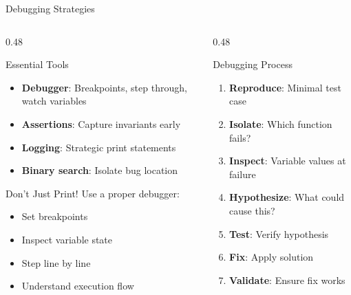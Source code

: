 \documentclass[aspectratio=169,xcolor=dvipsnames]{beamer}
\begin{document}
\begin{frame}{Debugging Strategies}
  \begin{columns}
    \begin{column}{0.48\textwidth}
      \begin{block}{Essential Tools}
        \begin{itemize}
          \item \textbf{Debugger}: Breakpoints, step through, watch variables
          \item \textbf{Assertions}: Capture invariants early
          \item \textbf{Logging}: Strategic print statements
          \item \textbf{Binary search}: Isolate bug location
        \end{itemize}
      \end{block}

      \vspace{0.3cm}

      \begin{alertblock}{Don't Just Print!}
        Use a proper debugger:
        \begin{itemize}
          \item Set breakpoints
          \item Inspect variable state
          \item Step line by line
          \item Understand execution flow
        \end{itemize}
      \end{alertblock}
    \end{column}
    \begin{column}{0.48\textwidth}
      \begin{block}{Debugging Process}
        \begin{enumerate}
          \item \textbf{Reproduce}: Minimal test case
          \item \textbf{Isolate}: Which function fails?
          \item \textbf{Inspect}: Variable values at failure
          \item \textbf{Hypothesize}: What could cause this?
          \item \textbf{Test}: Verify hypothesis
          \item \textbf{Fix}: Apply solution
          \item \textbf{Validate}: Ensure fix works
        \end{enumerate}
      \end{block}


\end{column}
\end{columns}
\end{frame}
\end{document}
